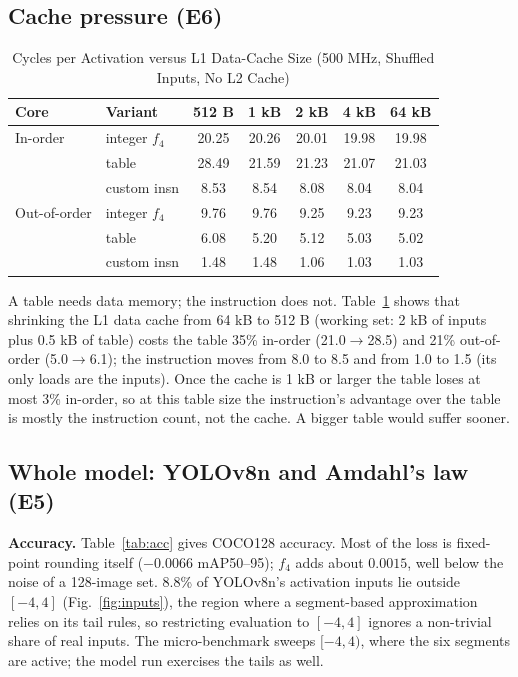 \documentclass[conference]{IEEEtran}
\begin{document}
\subsection{Cache pressure (E6)}
\begin{table}[t]
\caption{Cycles per Activation versus L1 Data-Cache Size (500 MHz, Shuffled Inputs, No L2 Cache)}
\label{tab:cache}
\centering\small
\begin{tabular}{llccccc}
\toprule
Core & Variant & 512 B & 1 kB & 2 kB & 4 kB & 64 kB\\
\midrule
In-order & integer $f_4$ & 20.25 & 20.26 & 20.01 & 19.98 & 19.98\\
 & table & 28.49 & 21.59 & 21.23 & 21.07 & 21.03\\
 & custom insn & 8.53 & 8.54 & 8.08 & 8.04 & 8.04\\
\midrule
Out-of-order & integer $f_4$ & 9.76 & 9.76 & 9.25 & 9.23 & 9.23\\
 & table & 6.08 & 5.20 & 5.12 & 5.03 & 5.02\\
 & custom insn & 1.48 & 1.48 & 1.06 & 1.03 & 1.03\\
\bottomrule
\end{tabular}
\end{table}
A table needs data memory; the instruction does not. Table~\ref{tab:cache} shows that shrinking the L1 data cache from 64 kB to 512 B (working set: 2 kB of inputs plus 0.5 kB of table) costs the table 35\% in-order (21.0$\to$28.5) and 21\% out-of-order (5.0$\to$6.1); the instruction moves from 8.0 to 8.5 and from 1.0 to 1.5 (its only loads are the inputs). Once the cache is 1 kB or larger the table loses at most 3\% in-order, so at this table size the instruction's advantage over the table is mostly the instruction count, not the cache. A bigger table would suffer sooner.

\subsection{Whole model: YOLOv8n and Amdahl's law (E5)}
\textbf{Accuracy.} Table~\ref{tab:acc} gives COCO128 accuracy. Most of the loss is fixed-point rounding itself ($-0.0066$ mAP50--95); $f_4$ adds about $0.0015$, well below the noise of a 128-image set. 8.8\% of YOLOv8n's activation inputs lie outside $[-4,4]$ (Fig.~\ref{fig:inputs}), the region where a segment-based approximation relies on its tail rules, so restricting evaluation to $[-4,4]$ ignores a non-trivial share of real inputs. The micro-benchmark sweeps $[-4,4)$, where the six segments are active; the model run exercises the tails as well.
\end{document}
